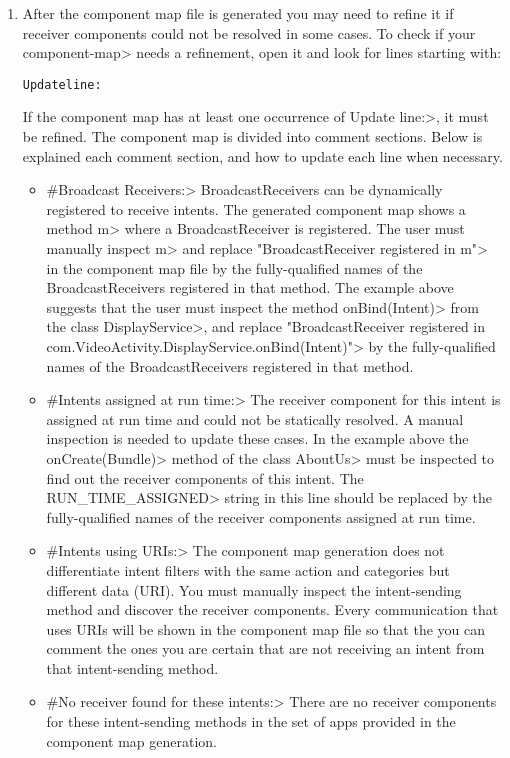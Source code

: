 \begin{enumerate}
\bigskip

\item
After the component map file is generated you may need to refine it if
receiver components could not be resolved in some cases. To check if your
\<component-map> needs a refinement, open it and look for lines starting with:

\begin{alltt}
Update line:
\end{alltt}
\bigskip
If the component map has at
least one occurrence of \<Update line:>, it must be refined.
The component map is divided into comment sections. Below is
explained each comment section, and how to update each line when necessary.

\begin{itemize}
\item
\<\#Broadcast Receivers:> BroadcastReceivers can be dynamically registered to
receive intents. The generated component map shows a method \<m> where a
BroadcastReceiver is registered. The user must manually inspect \<m> and replace
\<"BroadcastReceiver registered in m"> in the component map file by the
fully-qualified names of the BroadcastReceivers
registered in that method. The example above suggests that the user must inspect
the method \<onBind(Intent)> from the class \<DisplayService>, and replace
\<"BroadcastReceiver registered in
com.VideoActivity.DisplayService.onBind(Intent)"> by the fully-qualified names of
the BroadcastReceivers registered in that method.

\item
\<\#Intents assigned at run time:> The receiver component for this intent is
assigned at run time and could not be statically resolved. A manual inspection
is needed to update these cases. In the example above the \<onCreate(Bundle)>
method of the class \<AboutUs> must be inspected to find out the receiver
components of this intent. The \<RUN\_TIME\_ASSIGNED> string in this line
should be replaced by the fully-qualified names of the receiver components
assigned at run time.

\item
\<\#Intents using URIs:> The component map generation does not differentiate
intent filters with the same action and categories but different data (URI).
You must manually inspect the intent-sending method and discover the receiver
components. Every communication that uses URIs will be shown in the component
map file so that the you can comment the ones you are certain that are not
receiving an intent from that intent-sending method.

\item
\<\#No receiver found for these intents:> There are no receiver components for
these intent-sending methods in the set of apps provided in the component map
generation.
\end{itemize}
\end{enumerate}


